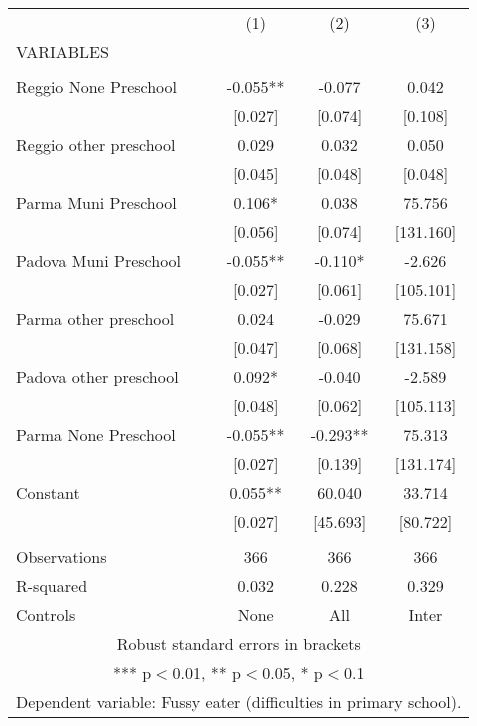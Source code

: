 \begin{tabular}{lccc} \hline
 & (1) & (2) & (3) \\
VARIABLES &  &  &  \\ \hline
 &  &  &  \\
Reggio None Preschool & -0.055** & -0.077 & 0.042 \\
 & [0.027] & [0.074] & [0.108] \\
Reggio other preschool & 0.029 & 0.032 & 0.050 \\
 & [0.045] & [0.048] & [0.048] \\
Parma Muni Preschool & 0.106* & 0.038 & 75.756 \\
 & [0.056] & [0.074] & [131.160] \\
Padova Muni Preschool & -0.055** & -0.110* & -2.626 \\
 & [0.027] & [0.061] & [105.101] \\
Parma other preschool & 0.024 & -0.029 & 75.671 \\
 & [0.047] & [0.068] & [131.158] \\
Padova other preschool & 0.092* & -0.040 & -2.589 \\
 & [0.048] & [0.062] & [105.113] \\
Parma None Preschool & -0.055** & -0.293** & 75.313 \\
 & [0.027] & [0.139] & [131.174] \\
Constant & 0.055** & 60.040 & 33.714 \\
 & [0.027] & [45.693] & [80.722] \\
 &  &  &  \\
Observations & 366 & 366 & 366 \\
R-squared & 0.032 & 0.228 & 0.329 \\
 Controls & None & All & Inter \\ \hline
\multicolumn{4}{c}{ Robust standard errors in brackets} \\
\multicolumn{4}{c}{ *** p$<$0.01, ** p$<$0.05, * p$<$0.1} \\
\multicolumn{4}{c}{ Dependent variable: Fussy eater (difficulties in primary school).} \\
\end{tabular}
